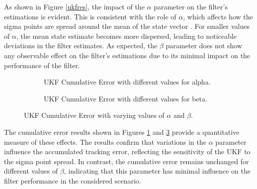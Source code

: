 As shown in Figure \ref{ukfres}, the impact of the \(\alpha\) parameter on the filter's estimations is evident. This is consistent with the role of \(\alpha\), which affects how the sigma points are spread around the mean of the state vector \cite{Cai2006}. For smaller values of \(\alpha\), the mean state estimate becomes more dispersed, leading to noticeable deviations in the filter estimates. As expected, the \(\beta\) parameter does not show any observable effect on the filter's estimations due to its minimal impact on the performance of the filter.
\newline
\begin{figure}[ht!]
    \centering
    \begin{subfigure}[b]{0.48\linewidth}
        \centering
        
        \caption{\ac{UKF} Cumulative Error with different values for alpha.}
        \label{ukfresCumError}
    \end{subfigure}
    \hfill
    \begin{subfigure}[b]{0.48\linewidth}
        \centering
        
        \caption{\ac{UKF} Cumulative Error with different values for beta.}
        \label{ukfresCumError2}
    \end{subfigure}
    \caption{\ac{UKF} Cumulative Error with varying values of \(\alpha\) and \(\beta\).}
\end{figure}

The cumulative error results shown in Figures \ref{ukfresCumError} and \ref{ukfresCumError2} provide a quantitative measure of these effects. The results confirm that variations in the \(\alpha\) parameter influence the accumulated tracking error, reflecting the sensitivity of the UKF to the sigma point spread. In contrast, the cumulative error remains unchanged for different values of \(\beta\), indicating that this parameter has minimal influence on the filter performance in the considered scenario.

